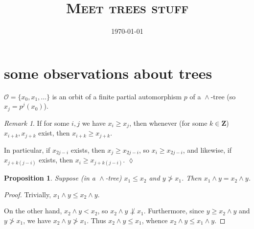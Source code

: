 \documentclass[final,a4paper,12pt,reqno]{amsart}
\date{\today}
\title{\textsc{Meet trees stuff}}
\newcommand{\bZ}{{\mathbf{Z}}}
\newcommand{\meet}{\mathop{\wedge}}
\newtheorem{prop}[thm]{Proposition}
\theoremstyle{remark}
\newtheorem{rem}[thm]{Remark}
\theoremstyle{definition}
\newcommand{\xqed}[1]{%
	\leavevmode\unskip\penalty9999 \hbox{}\nobreak\hfill
	\quad\hbox{\ensuremath{#1}}}
\let \leq \leqslant
\let \geq \geqslant
\begin{document}
	\maketitle
	\section{some observations about trees}
	$\mathcal O=\{x_0,x_1,\ldots\}$ is an orbit of a finite partial automorphism $p$ of a $\meet$-tree (so $x_j=p^j(x_0)$).
	
	\begin{rem}
		\label{rem:iterations}
		If for some $i,j$ we have $x_i\geq x_j$, then whenever (for some $k\in \bZ$) $x_{i+k},x_{j+k}$ exist, then $x_{i+k}\geq x_{j+k}$.
		
		In particular, if $x_{2j-i}$ exists, then $x_j\geq x_{2j-i}$, so $x_i\geq x_{2j-i}$, and likewise, if $x_{j+k(j-i)}$ exists, then $x_i\geq x_{j+k(j-i)}$.\xqed{\lozenge}
	\end{rem}
	
	\begin{prop}
		\label{prop:meet_of_tree}
		Suppose (in a $\meet$-tree) $x_1\leq x_2$ and $y\not> x_1$. Then $x_1\meet y=x_2\meet y$.
	\end{prop}
	\begin{proof}
		Trivially, $x_1\meet y\leq x_2\meet y$.
		
		On the other hand, $x_2\meet y<x_2$, so $x_2\meet y\not \perp x_1$. Furthermore, since $y\geq x_2\meet y$ and $y\not> x_1$, we have $x_2\meet y\not > x_1$. Thus $x_2\meet y\leq x_1$, whence $x_2\meet y\leq x_1\meet y$.
	\end{proof}
	
	
	
\end{document}
